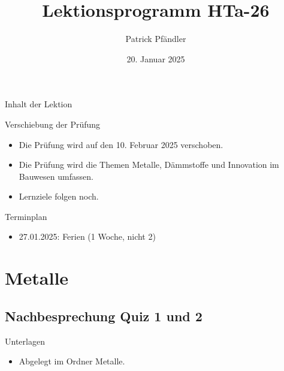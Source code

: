





\title{\textbf{Lektionsprogramm HTa-26}}
\author{Patrick Pfändler}
\date{20. Januar 2025}




\frame{\titlepage}

\begin{frame}{Inhalt der Lektion}
	\tableofcontents
\end{frame}


\begin{frame}{Verschiebung der Prüfung}
	\begin{itemize}
		\item[\textbullet]  Die Prüfung wird auf den 10. Februar 2025 verschoben.
		\item[\textbullet]  Die Prüfung wird die Themen Metalle, Dämmstoffe und Innovation im Bauwesen umfassen.
		\item[\textbullet]  Lernziele folgen noch.
	\end{itemize}
\end{frame}


\begin{frame}{Terminplan}

	\begin{itemize}
		\item 27.01.2025: Ferien (1 Woche, nicht 2)
	\end{itemize}

\end{frame}



\section{Metalle}
\BlueSectionSlide
\subsection{Nachbesprechung Quiz 1 und 2}

\begin{frame}{Unterlagen}

	\begin{itemize}
		\item Abgelegt im Ordner Metalle.
	\end{itemize}

\end{frame}


